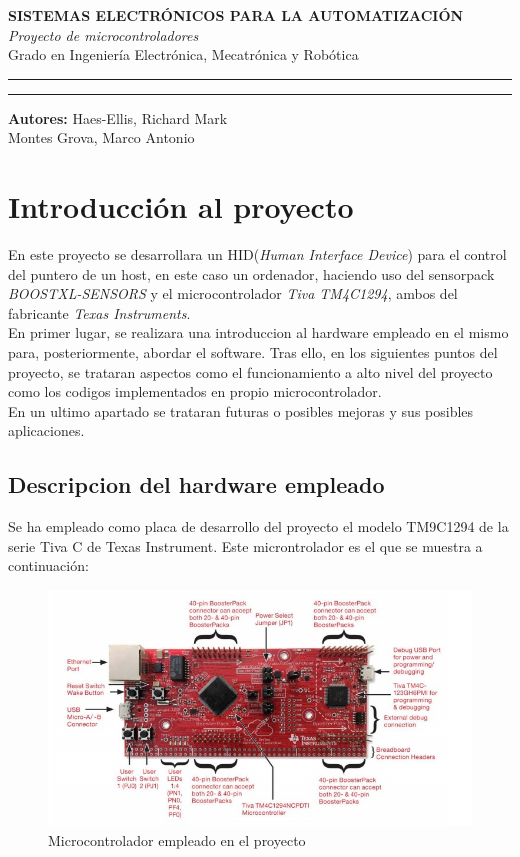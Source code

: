 \documentclass[a4paper,twoside]{article}
\begin{document}
\begin{titlepage}
 \centering
 \Huge{\textbf{SISTEMAS ELECTRÓNICOS PARA LA AUTOMATIZACIÓN}} \\
 \Huge{\textit{Proyecto de microcontroladores}}\\

 \vspace{1cm}
 \LARGE{Grado en Ingeniería Electrónica, Mecatrónica y Robótica}\\
 \rule{\textwidth}{0.1mm}
\Large{\tableofcontents}
 \vspace{2cm}
 \rule{\textwidth}{0.1mm}
 \Large{\textbf{Autores:} Haes-Ellis, Richard Mark\\
 Montes Grova, Marco Antonio}
\end{titlepage}
\newpage

\section{Introducción al proyecto}
En este proyecto se desarrollara un HID(\textit{Human Interface Device}) para el control del puntero de un host, en este caso un ordenador, haciendo  uso del sensorpack \textit{BOOSTXL-SENSORS} y el microcontrolador \textit{Tiva TM4C1294}, ambos del fabricante \textit{Texas Instruments}.\\
En primer lugar, se realizara una introduccion al hardware empleado en el mismo para, posteriormente, abordar el software. Tras ello, en los siguientes puntos del proyecto, se trataran aspectos como el funcionamiento a alto nivel del proyecto como los codigos implementados en propio microcontrolador.\\
En un ultimo apartado se trataran futuras o posibles mejoras y sus posibles aplicaciones.
\subsection{Descripcion del hardware empleado}
Se ha empleado como placa de desarrollo del proyecto el modelo TM9C1294 de la serie Tiva C de Texas Instrument. Este microntrolador es el que se muestra a continuación: \\
 \begin{figure}[h!]
	\centering
	\includegraphics[width=.7\textwidth]{../images/tiva_tm4c1294}
  \caption{Microcontrolador empleado en el proyecto}
\end{figure}
\end{document}
